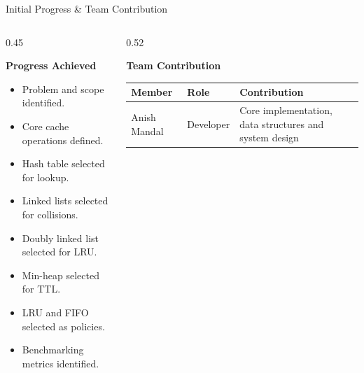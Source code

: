 \documentclass[aspectratio=169,10pt]{beamer}
\begin{document}
\begin{frame}{Initial Progress \& Team Contribution}

\begin{columns}[T]

\begin{column}{0.45\textwidth}

\textbf{\color{GEUBlue}Progress Achieved}

\begin{itemize}

\item Problem and scope identified.

\item Core cache operations defined.

\item Hash table selected for lookup.

\item Linked lists selected for collisions.

\item Doubly linked list selected for LRU.

\item Min-heap selected for TTL.

\item LRU and FIFO selected as policies.

\item Benchmarking metrics identified.

\end{itemize}

\end{column}

\begin{column}{0.52\textwidth}

\textbf{\color{GEUBlue}Team Contribution}

\vspace{2mm}

\scriptsize

\begin{tabularx}{\textwidth}{
    @{}
    >{\raggedright\arraybackslash}p{1.45cm}
    >{\raggedright\arraybackslash}p{1.35cm}
    X
    @{}
}

\toprule

Member & Role & Contribution \\

\midrule

Anish Mandal &
Developer &
Core implementation, data structures and system design \\


\end{tabularx}
\end{column}
\end{columns}
\end{frame}
\end{document}
